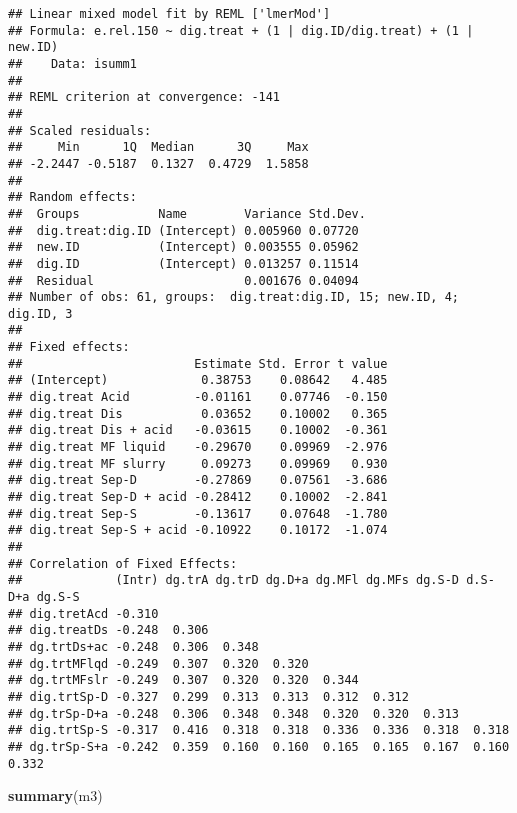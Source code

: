 \documentclass[
]{article}
\newenvironment{Shaded}{\begin{snugshade}}{\end{snugshade}}
\newcommand{\FunctionTok}[1]{\textcolor[rgb]{0.13,0.29,0.53}{\textbf{#1}}}
\newcommand{\NormalTok}[1]{#1}
\begin{document}
\begin{verbatim}
## Linear mixed model fit by REML ['lmerMod']
## Formula: e.rel.150 ~ dig.treat + (1 | dig.ID/dig.treat) + (1 | new.ID)
##    Data: isumm1
## 
## REML criterion at convergence: -141
## 
## Scaled residuals: 
##     Min      1Q  Median      3Q     Max 
## -2.2447 -0.5187  0.1327  0.4729  1.5858 
## 
## Random effects:
##  Groups           Name        Variance Std.Dev.
##  dig.treat:dig.ID (Intercept) 0.005960 0.07720 
##  new.ID           (Intercept) 0.003555 0.05962 
##  dig.ID           (Intercept) 0.013257 0.11514 
##  Residual                     0.001676 0.04094 
## Number of obs: 61, groups:  dig.treat:dig.ID, 15; new.ID, 4; dig.ID, 3
## 
## Fixed effects:
##                        Estimate Std. Error t value
## (Intercept)             0.38753    0.08642   4.485
## dig.treat Acid         -0.01161    0.07746  -0.150
## dig.treat Dis           0.03652    0.10002   0.365
## dig.treat Dis + acid   -0.03615    0.10002  -0.361
## dig.treat MF liquid    -0.29670    0.09969  -2.976
## dig.treat MF slurry     0.09273    0.09969   0.930
## dig.treat Sep-D        -0.27869    0.07561  -3.686
## dig.treat Sep-D + acid -0.28412    0.10002  -2.841
## dig.treat Sep-S        -0.13617    0.07648  -1.780
## dig.treat Sep-S + acid -0.10922    0.10172  -1.074
## 
## Correlation of Fixed Effects:
##             (Intr) dg.trA dg.trD dg.D+a dg.MFl dg.MFs dg.S-D d.S-D+a dg.S-S
## dig.tretAcd -0.310                                                         
## dig.treatDs -0.248  0.306                                                  
## dg.trtDs+ac -0.248  0.306  0.348                                           
## dg.trtMFlqd -0.249  0.307  0.320  0.320                                    
## dg.trtMFslr -0.249  0.307  0.320  0.320  0.344                             
## dig.trtSp-D -0.327  0.299  0.313  0.313  0.312  0.312                      
## dg.trSp-D+a -0.248  0.306  0.348  0.348  0.320  0.320  0.313               
## dig.trtSp-S -0.317  0.416  0.318  0.318  0.336  0.336  0.318  0.318        
## dg.trSp-S+a -0.242  0.359  0.160  0.160  0.165  0.165  0.167  0.160   0.332
\end{verbatim}

\begin{Shaded}
\begin{Highlighting}[]
\FunctionTok{summary}\NormalTok{(m3)}
\end{Highlighting}
\end{Shaded}
\end{document}
